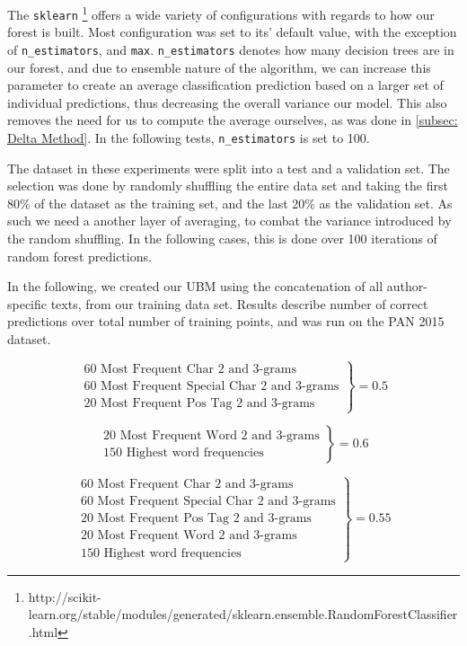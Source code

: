 The \texttt{sklearn}
\footnote{http://scikit-learn.org/stable/modules/generated/sklearn.ensemble.RandomForestClassifier.html} offers a wide variety of configurations with regards to
how our forest is built. Most configuration was set to its' default value, with
the exception of \texttt{n\_estimators}, and \texttt{max\features}. \texttt{n\_estimators} denotes how many decision trees
are in our forest, and due to ensemble nature of the algorithm, we can increase
this parameter to create an average classification prediction based on a larger
set of individual predictions, thus decreasing the overall variance our model.
This also removes the need for us to compute the average ourselves, as was done
in \ref{subsec: Delta Method}. In the following tests, \texttt{n\_estimators} is
set to 100. 

The dataset in these experiments were split into a test and a validation set.
The selection was done by randomly shuffling the entire data set and taking
the first 80\% of the dataset as the training set, and the last 20\% as the
validation set. As such we need a another layer of averaging, to combat the variance introduced by the random shuffling. In the following cases, this is done over 100 iterations of random forest predictions. 

In the following, we created our \gls{UBM} using the concatenation of all
author-specific texts, from our training data set. Results describe number of
correct predictions over total number of training points, and was run on the PAN
2015 dataset.

$$
\left.
                \begin{array}{ll}
                  \text{60 Most Frequent Char 2 and 3-grams}\\
                  \text{60 Most Frequent Special Char 2 and 3-grams}\\
                  \text{20 Most Frequent Pos Tag 2 and 3-grams}
                \end{array}
              \right\rbrace = 0.5
$$

$$
\left.
                \begin{array}{ll}
                  \text{20 Most Frequent Word 2 and 3-grams}\\
                  \text{150 Highest word frequencies}
                \end{array}
              \right\rbrace = 0.6
$$

$$
\left.
                \begin{array}{ll}
                  \text{60 Most Frequent Char 2 and 3-grams}\\
                  \text{60 Most Frequent Special Char 2 and 3-grams}\\
                  \text{20 Most Frequent Pos Tag 2 and 3-grams}\\
                  \text{20 Most Frequent Word 2 and 3-grams}\\
                  \text{150 Highest word frequencies}
                \end{array}
              \right\rbrace = 0.55
$$

